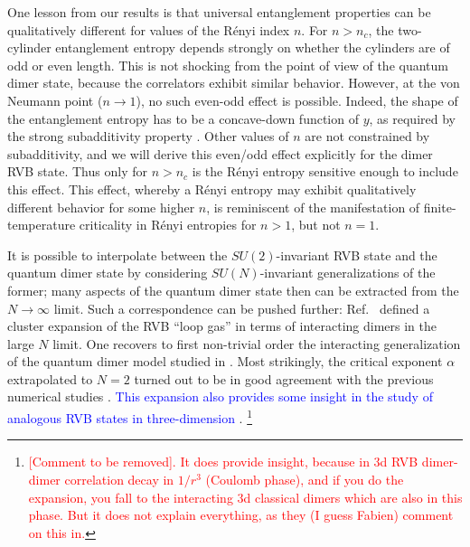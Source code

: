 \documentclass[11pt]{iopart}
\begin{document}
One lesson from our results is that universal entanglement properties can be qualitatively different for values of the R\'enyi index $n$. For $n>n_c$, the two-cylinder entanglement entropy depends strongly on whether the cylinders are of odd or even length. This is not shocking from the point of view of the quantum dimer state, because the correlators exhibit similar behavior. However, at the von Neumann point ($n\to 1$), no such even-odd effect is possible. Indeed, the shape of the entanglement entropy has to be a concave-down function of $y$, as required by the strong subadditivity property \cite{Strongsubadditivity}. Other values of $n$ are not constrained by subadditivity, and we will derive this even/odd effect explicitly for the dimer RVB state. 
Thus only for $n>n_c$ is the R\'enyi entropy sensitive enough to include this effect. 
This effect, whereby a R\'enyi entropy may exhibit qualitatively different behavior for some higher $n$, is reminiscent of the manifestation of finite-temperature criticality in R\'enyi entropies for $n>1$, but not $n=1$\cite{RenyiXing}. 

It is possible to interpolate between the $SU(2)$-invariant RVB state and the quantum dimer state by considering $SU(N)$-invariant generalizations of the former; many aspects of the quantum dimer state then can be extracted from the $N\to\infty$ limit. Such a correspondence can be pushed further: Ref.~\cite{Damle} defined a cluster expansion of the RVB ``loop gas''\cite{Sutherland_loops} in terms of interacting dimers in the large $N$ limit. One recovers to first non-trivial order the interacting generalization of the quantum dimer model studied in \cite{Alet_dimers1,Alet_dimers2}. Most strikingly, the critical exponent $\alpha$ extrapolated to $N=2$ turned out to be in good agreement with the previous numerical studies \cite{RVB1,RVB2}. \textcolor{blue}{This expansion also provides some insight in the study of analogous RVB states in three-dimension \cite{AAM,AMPMJ}}. \footnote{\textcolor{red}{[Comment to be removed]. It does provide insight, because in 3d RVB dimer-dimer correlation decay in $1/r^3$ (Coulomb phase), and if you do the expansion, you fall to the interacting 3d classical dimers which are also in this phase. But it does not explain everything, as they (I guess Fabien) comment on this in\cite{AAM}.}} 
\end{document}
